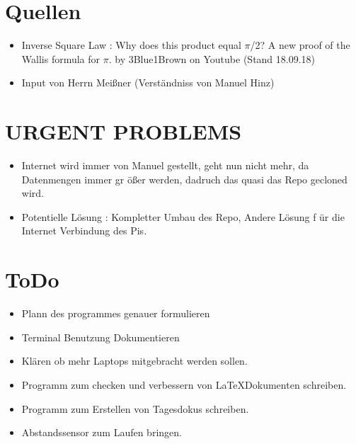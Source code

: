 \documentclass{article}
\begin{document}
\section{Quellen}

\begin{itemize}

\item Inverse Square Law : Why does this product equal $\pi$/2? A new proof of the Wallis formula for $\pi$. by 3Blue1Brown on Youtube (Stand 18.09.18)

\item Input von Herrn Meißner (Verst\"{a}ndniss von Manuel Hinz)

\end{itemize}

\section{URGENT PROBLEMS}

\begin{itemize}

\item Internet wird immer von Manuel gestellt, geht nun nicht mehr, da Datenmengen immer gr
\"{o}ßer werden, dadruch das quasi das Repo gecloned wird.

\item Potentielle L\"{o}sung : Kompletter Umbau des Repo, Andere L\"{o}sung f
\"{u}r die Internet Verbindung des Pis. 

\end{itemize}

\section{ToDo}

\begin{itemize}

\item Plann des programmes genauer formulieren

\item Terminal Benutzung Dokumentieren

\item Kl\"{a}ren ob mehr Laptops mitgebracht werden sollen.

\item Programm zum checken und verbessern von \LaTeX Dokumenten schreiben.

\item Programm zum Erstellen von Tagesdokus schreiben.

\item Abstandssensor zum Laufen bringen.

\end{itemize}
\end{document}
